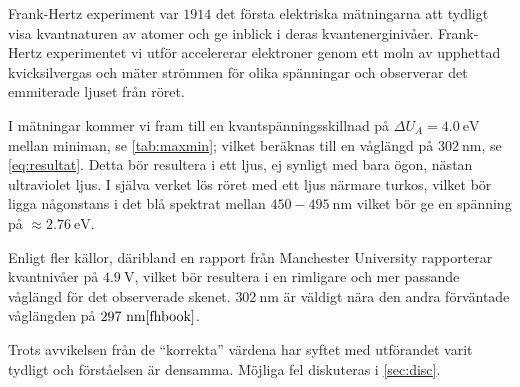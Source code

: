 Frank-Hertz experiment var $1914$ det första elektriska mätningarna att tydligt visa kvantnaturen av atomer och ge inblick i deras kvantenerginivåer. Frank-Hertz experimentet vi utför accelererar elektroner genom ett moln av upphettad kvicksilvergas och mäter strömmen för olika spänningar och observerar det emmiterade ljuset från röret.

I mätningar kommer vi fram till en kvantspänningsskillnad på $\Delta U_A = 4.0~\textrm{eV}$ mellan miniman, se \cref{tab:maxmin}; vilket beräknas till en våglängd på $302~\textrm{nm}$, se \cref{eq:resultat}. Detta bör resultera i ett ljus, ej synligt med bara ögon, nästan ultraviolet ljus. I själva verket lös röret med ett ljus närmare turkos, vilket bör ligga någonstans i det blå spektrat mellan $450 - 495~\textrm{nm}$ vilket bör ge en spänning på $\approx 2.76~\textrm{eV}$.

Enligt fler källor, däribland en rapport från Manchester University\cite{bmfrankhertz} rapporterar kvantnivåer på $4.9~\textrm{V}$, vilket bör resultera i en rimligare och mer passande våglängd för det observerade skenet. $302~\textrm{nm}$ är väldigt nära den andra förväntade våglängden på $297~\textrm{nm}\cite{fhbook}$. 

Trots avvikelsen från de ``korrekta'' värdena har syftet med utförandet varit tydligt och förståelsen är densamma. Möjliga fel diskuteras i \cref{sec:disc}.